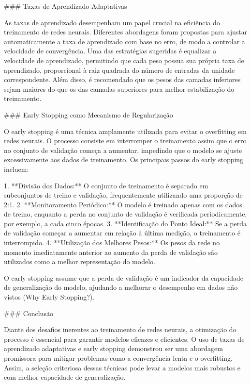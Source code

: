 \documentclass[conference]{IEEEtran}
\begin{document}
    ### Taxas de Aprendizado Adaptativas
    
    As taxas de aprendizado desempenham um papel crucial na eficiência do treinamento de redes neurais. Diferentes abordagens foram propostas para ajustar automaticamente a taxa de aprendizado com base no erro, de modo a controlar a velocidade de convergência. Uma das estratégias sugeridas é equalizar a velocidade de aprendizado, permitindo que cada peso possua sua própria taxa de aprendizado, proporcional à raiz quadrada do número de entradas da unidade correspondente. Além disso, é recomendado que os pesos das camadas inferiores sejam maiores do que os das camadas superiores para melhor estabilização do treinamento.
    
    ### Early Stopping como Mecanismo de Regularização
    
    O early stopping é uma técnica amplamente utilizada para evitar o overfitting em redes neurais. O processo consiste em interromper o treinamento assim que o erro no conjunto de validação começa a aumentar, impedindo que o modelo se ajuste excessivamente aos dados de treinamento. Os principais passos do early stopping incluem:
    
    1. **Divisão dos Dados:** O conjunto de treinamento é separado em subconjuntos de treino e validação, frequentemente utilizando uma proporção de 2:1.
    2. **Monitoramento Periódico:** O modelo é treinado apenas com os dados de treino, enquanto a perda no conjunto de validação é verificada periodicamente, por exemplo, a cada cinco épocas.
    3. **Identificação do Ponto Ideal:** Se a perda de validação começar a aumentar em relação à última medição, o treinamento é interrompido.
    4. **Utilização dos Melhores Pesos:** Os pesos da rede no momento imediatamente anterior ao aumento da perda de validação são utilizados como a melhor representação do modelo.
    
    O early stopping assume que a perda de validação é um indicador da capacidade de generalização do modelo, ajudando a melhorar o desempenho em dados não vistos (Why Early Stopping?).
    
    ### Conclusão
    
    Diante dos desafios inerentes ao treinamento de redes neurais, a otimização do processo é essencial para garantir modelos eficazes e eficientes. O uso de taxas de aprendizado adaptativas e early stopping demonstrou ser uma abordagem promissora para mitigar problemas como a convergência lenta e o overfitting. Assim, a seleção criteriosa dessas técnicas pode levar a modelos mais robustos e com melhor capacidade de generalização.
        
\end{document}
